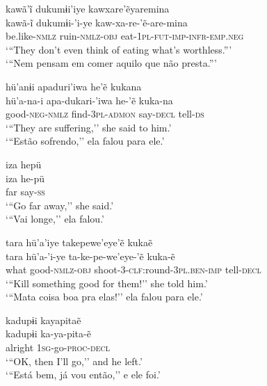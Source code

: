 \documentclass[output=paper,
modfonts,nonflat
]{langsci/langscibook}
\begin{document}
\ea  kawã'ĩ dukumɨi'iye kawxare'ẽyaremina  \\[.3em]
\gll kawã-ĩ dukumɨi-'i-ye kaw-xa-re-'ẽ-are-mina\\
 be.like-\textsc{nmlz} ruin-\textsc{nmlz-obj} eat-\textsc{1pl-fut-imp-infr-emp.neg}\\
\glt `{``}They don't even think of eating what's worthless.{''}' \\
`{``}Nem pensam em comer aquilo que não presta.{''}' \\
\z  
 
\largerpage[2]
\ea     hü'anɨi apaduri'iwa he'ẽ kukana\\[.3em]
\gll 	hü'a-na-i apa-dukari-'iwa he-'ẽ kuka-na\\
good-\textsc{neg-nmlz} find-\textsc{3pl-admon} say-\textsc{decl} tell-\textsc{ds}\\
\glt    `{``}They are suffering,'' she said to him.' \\
`{``}Estão sofrendo,'' ela falou para ele.'
\z  

 
\ea     iza hepü  \\[.3em]
\gll 	iza he-pü\\
far say-\textsc{ss}\\
 \glt     `{``}Go far away,'' she said.'  \\
 `{``}Vai longe,'' ela falou.' \\
\z  

\ea   tara hü'a'iye takepewe'eye'ẽ kukaẽ  \\[.3em]
\gll 	 tara hü'a-'i-ye ta-ke-pe-we'eye-'ẽ kuka-ẽ\\
what good-\textsc{nmlz-obj} shoot-\textsc{3-clf:}round-\textsc{3pl.ben-imp} tell-\textsc{decl}\\
\glt   `{``}Kill something good for them!'' she told him.' \\
 `{``}Mata coisa boa pra elas!'' ela falou para ele.' \\
\z  

\ea   kadupɨi kayapitaẽ \\[.3em]
\gll 	 kadupɨi ka-ya-pita-ẽ \\
alright \textsc{1sg}-go-\textsc{proc-decl}\\
\glt   `{``}OK, then I'll go,'' and he left.'\\
`{``}Está bem, já vou então,'' e ele foi.'\\
\z  
\end{document}

